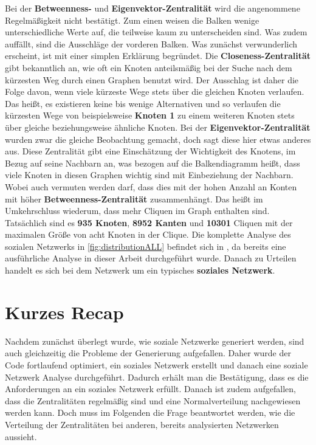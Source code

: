 Bei der \textbf{Betweenness-} und \textbf{Eigenvektor-Zentralität} wird die angenommene Regelmäßigkeit nicht bestätigt. Zum einen weisen die Balken wenige unterschiedliche Werte auf, die teilweise kaum zu unterscheiden sind. Was zudem auffällt, sind die Ausschläge der vorderen Balken. Was zunächst verwunderlich erscheint, ist mit einer simplen Erklärung begründet. Die \textbf{Closeness-Zentralität} gibt bekanntlich an, wie oft ein Knoten anteilsmäßig bei der Suche nach dem kürzesten Weg durch einen Graphen benutzt wird. Der Ausschlag ist daher die Folge davon, wenn viele kürzeste Wege stets über die gleichen Knoten verlaufen. Das heißt, es existieren keine bis wenige Alternativen und so verlaufen die kürzesten Wege von beispielsweise \textbf{Knoten 1} zu einem weiteren Knoten stets über gleiche beziehungsweise ähnliche Knoten. Bei der \textbf{Eigenvektor-Zentralität} wurden zwar die gleiche Beobachtung gemacht, doch sagt diese hier etwas anderes aus. Diese Zentralität gibt eine Einschätzung der Wichtigkeit des Knotens, im Bezug auf seine Nachbarn an, was bezogen auf die Balkendiagramm heißt, dass viele Knoten in diesen Graphen wichtig sind mit Einbeziehung der Nachbarn. Wobei auch vermuten werden darf, dass dies mit der hohen Anzahl an Konten mit höher \textbf{Betweenness-Zentralität} zusammenhängt. Das heißt im Umkehrschluss wiederum, dass mehr Cliquen im Graph enthalten sind. Tatsächlich sind es \textbf{935 Knoten}, \textbf{8952 Kanten} und \textbf{10301} Cliquen mit der maximalen Größe von acht Knoten in der Clique.
Die komplette Analyse des sozialen Netzwerks in \ref{fig:distributionALL} befindet sich in \cite{TZ}, da bereits eine ausführliche Analyse in dieser Arbeit durchgeführt wurde. Danach zu Urteilen handelt es sich bei dem Netzwerk um ein typisches \textbf{soziales Netzwerk}.

\section{Kurzes Recap}
Nachdem zunächst überlegt wurde, wie soziale Netzwerke generiert werden, sind auch gleichzeitig die Probleme der Generierung aufgefallen. Daher wurde der Code fortlaufend optimiert, ein soziales Netzwerk erstellt und danach eine soziale Netzwerk Analyse durchgeführt. Dadurch erhält man die Bestätigung, dass es die Anforderungen an ein soziales Netzwerk erfüllt. Danach ist zudem aufgefallen, dass die Zentralitäten regelmäßig sind und eine Normalverteilung nachgewiesen werden kann. Doch muss im Folgenden die Frage beantwortet werden, wie die Verteilung der Zentralitäten bei anderen, bereits analysierten Netzwerken aussieht.
